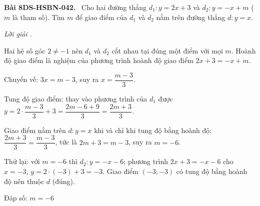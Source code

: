 \documentclass[12pt,a4paper]{article}
\newenvironment{problem}[1][]{\par\medskip\noindent\textbf{Bài #1.}\ }{\par}
\newenvironment{solution}[1][]{\par\noindent\textit{Lời giải #1.}\par}{\par}
\begin{document}
\begin{problem}[8DS-HSBN-042]
Cho hai đường thẳng $d_1\colon y = 2x + 3$ và $d_2\colon y = -x + m$ ($m$ là tham số). Tìm $m$ để giao điểm của $d_1$ và $d_2$ nằm trên đường thẳng $d\colon y = x$.

\begin{solution}
Hai hệ số góc $2 \neq -1$ nên $d_1$ và $d_2$ cắt nhau tại đúng một điểm với mọi $m$. Hoành độ giao điểm là nghiệm của phương trình hoành độ giao điểm $2x + 3 = -x + m$.

Chuyển vế: $3x = m - 3$, suy ra $x = \dfrac{m - 3}{3}$.

Tung độ giao điểm: thay vào phương trình của $d_1$ được $y = 2 \cdot \dfrac{m - 3}{3} + 3 = \dfrac{2m - 6 + 9}{3} = \dfrac{2m + 3}{3}$.

Giao điểm nằm trên $d\colon y = x$ khi và chỉ khi tung độ bằng hoành độ: $\dfrac{2m + 3}{3} = \dfrac{m - 3}{3}$, tức là $2m + 3 = m - 3$, suy ra $m = -6$.

Thử lại: với $m = -6$ thì $d_2\colon y = -x - 6$; phương trình $2x + 3 = -x - 6$ cho $x = -3$, $y = 2 \cdot (-3) + 3 = -3$. Giao điểm $(-3; -3)$ có tung độ bằng hoành độ nên thuộc $d$ (đúng).

Đáp số: $\boxed{m = -6}$
\end{solution}
\end{problem}
\end{document}
